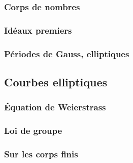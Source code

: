 \documentclass[a4paper]{article} %
\numberwithin{equation}{section}
\newcommand\GF[1]{\mathbb{F}_{#1}}
\begin{document}
\subsubsection{Corps de nombres}

\subsubsection{Idéaux premiers}

\subsubsection{Périodes de Gauss, elliptiques}

\subsection{Courbes elliptiques}

\subsubsection{Équation de Weierstrass}

\subsubsection{Loi de groupe}

\subsubsection{Sur les corps finis}
\end{document}
